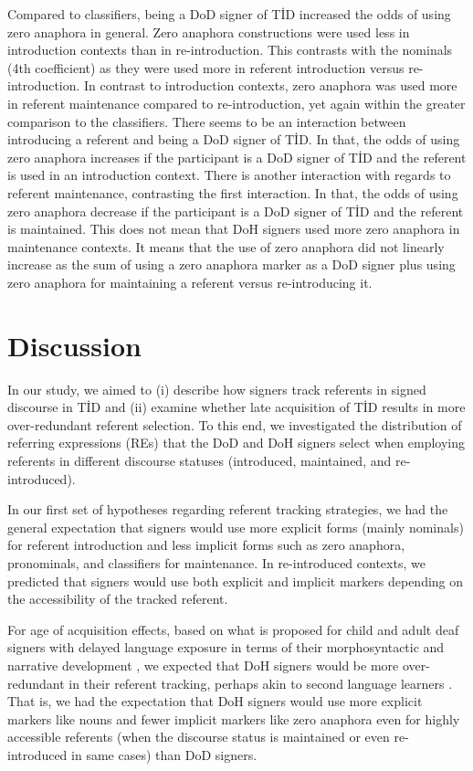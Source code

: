 \documentclass[review]{elsarticle} %
\begin{document}
Compared to classifiers, being a DoD signer of TİD increased the odds of
using zero anaphora in general. Zero anaphora constructions were used
less in introduction contexts than in re-introduction. This contrasts
with the nominals (4th coefficient) as they were used more in referent
introduction versus re-introduction. In contrast to introduction
contexts, zero anaphora was used more in referent maintenance compared
to re-introduction, yet again within the greater comparison to the
classifiers. There seems to be an interaction between introducing a
referent and being a DoD signer of TİD. In that, the odds of using zero
anaphora increases if the participant is a DoD signer of TİD and the
referent is used in an introduction context. There is another
interaction with regards to referent maintenance, contrasting the first
interaction. In that, the odds of using zero anaphora decrease if the
participant is a DoD signer of TİD and the referent is maintained. This
does not mean that DoH signers used more zero anaphora in maintenance
contexts. It means that the use of zero anaphora did not linearly
increase as the sum of using a zero anaphora marker as a DoD signer plus
using zero anaphora for maintaining a referent versus re-introducing it.

\hypertarget{discussion}{%
\section{Discussion}\label{discussion}}

In our study, we aimed to (i) describe how signers track referents in
signed discourse in TİD and (ii) examine whether late acquisition of TİD
results in more over-redundant referent selection. To this end, we
investigated the distribution of referring expressions (REs) that the
DoD and DoH signers select when employing referents in different
discourse statuses (introduced, maintained, and re-introduced).

In our first set of hypotheses regarding referent tracking strategies,
we had the general expectation that signers would use more explicit
forms (mainly nominals) for referent introduction and less implicit
forms such as zero anaphora, pronominals, and classifiers for
maintenance. In re-introduced contexts, we predicted that signers would
use both explicit and implicit markers depending on the accessibility of
the tracked referent.

For age of acquisition effects, based on what is proposed for child and
adult deaf signers with delayed language exposure in terms of their
morphosyntactic \citep{boudreault2006, cormier2012, kayaba2022} and
narrative development \citep{becker2009, cormier2013}, we expected that
DoH signers would be more over-redundant in their referent tracking,
perhaps akin to second language learners
\citep{frederiksen2019, bel2015}. That is, we had the expectation that
DoH signers would use more explicit markers like nouns and fewer
implicit markers like zero anaphora even for highly accessible referents
(when the discourse status is maintained or even re-introduced in same
cases) than DoD signers.
\end{document}
